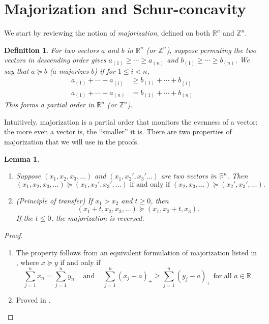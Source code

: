 \documentclass[11pt]{article}
\newtheorem{definition}{Definition}
\newtheorem{lemma}[corollary]{Lemma}
\newcommand{\RR}{\mathbb{R}}
\newcommand{\ZZ}{\mathbb{Z}}
\begin{document}
\section{Majorization and Schur-concavity}
\label{sec:maj}

We start by reviewing the notion of {\em majorization}, defined on both $\RR^n$ and $\ZZ^n$.

\begin{definition}
For two vectors $a$ and $b$ in $\RR^n$ (or $\ZZ^n$), suppose permuting the two vectors in descending order gives
$a_{\left(1\right)} \ge \cdots \ge a_{\left(n\right)}$ and $b_{\left(1\right)} \ge \cdots \ge b_{\left(n\right)}$. We say that $a \succeq b$ ($a$ majorizes $b$) if for $1 \le i < n$,
\begin{align*}
a_{\left(1\right)} + \cdots + a_{\left(i\right)} & \ge b_{\left(1\right)} + \cdots + b_{\left(i\right)} \\
a_{\left(1\right)} + \cdots + a_{\left(n\right)} & = b_{\left(1\right)} + \cdots + b_{\left(n\right)}
\end{align*}
This forms a partial order in $\RR^n$ (or $\ZZ^n$).
\end{definition}

Intuitively, majorization is a partial order that monitors the evenness of a vector: the more even a vector is, the ``smaller'' it is. There are two properties of majorization that we will use in the proofs.

\begin{lemma}
\begin{enumerate}
\item Suppose $\left(x_1, x_2, x_3, \ldots\right)$ and $\left(x_1, x_2', x_3' \ldots\right)$ are two vectors in $\RR^n$. Then
$$\left(x_1, x_2, x_3, \ldots\right) \succeq \left(x_1, x_2', x_3', \ldots\right) \text{ if and only if } \left(x_2, x_3, \ldots\right) \succeq \left(x_2', x_3', \ldots\right).$$
\item (Principle of transfer) If $x_1 > x_2$ and $t \ge 0$, then
$$\left(x_1 + t, x_2, x_3, \ldots\right) \succeq \left(x_1, x_2 + t, x_3\right).$$
If the $t \le 0$, the majorization is reversed.
\end{enumerate}
\label{lma:twoprop}
\end{lemma}

\begin{proof}
\begin{enumerate}
\item The property follows from an equivalent formulation of majorization listed in \citet{Marshall:2010hb}, where $x \succeq y$ if and only if
$$\sum_{j=1}^n x_n = \sum_{j=1}^n y_n ~~~~ \text{ and } ~~~~ \sum_{j=1}^n \left(x_j - a\right)_+ \ge \sum_{j=1}^n \left(y_j - a\right)_+ \text{ for all } a \in \RR.$$

\item Proved in \citet{Marshall:2010hb}. \qedhere
\end{enumerate}
\end{proof}
\end{document}
